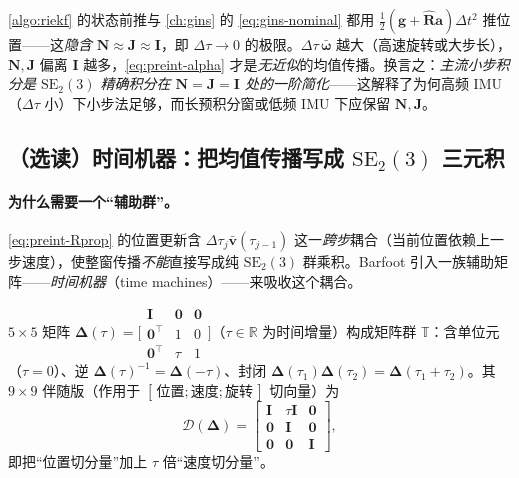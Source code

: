 \begin{insight}
\cref{algo:riekf} 的状态前推与 \cref{ch:gins} 的 \cref{eq:gins-nominal} 都用 $\tfrac12(\mathbf{g}+\hat{\mathbf{R}}\mathbf{a})\Delta t^2$ 推位置——这\emph{隐含} $\mathbf{N}\approx\mathbf{J}\approx\mathbf{I}$，即 $\Delta\tau\to0$ 的极限。$\Delta\tau\,\bar{\boldsymbol{\omega}}$ 越大（高速旋转或大步长），$\mathbf{N},\mathbf{J}$ 偏离 $\mathbf{I}$ 越多，\cref{eq:preint-alpha} 才是\emph{无近似}的均值传播。换言之：\emph{主流小步积分是 $\mathrm{SE}_2(3)$ 精确积分在 $\mathbf{N}=\mathbf{J}=\mathbf{I}$ 处的一阶简化}——这解释了为何高频 IMU（$\Delta\tau$ 小）下小步法足够，而长预积分窗或低频 IMU 下应保留 $\mathbf{N},\mathbf{J}$。
\end{insight}

\subsection{（选读）时间机器：把均值传播写成 \texorpdfstring{$\mathrm{SE}_2(3)$}{SE2(3)} 三元积}
\label{subsec:preint-timemachine}

\paragraph{为什么需要一个“辅助群”。}
\cref{eq:preint-Rprop} 的位置更新含 $\Delta\tau_j\bar{\mathbf{v}}(\tau_{j-1})$ 这一\emph{跨步}耦合（当前位置依赖上一步速度），使整窗传播\emph{不能}直接写成纯 $\mathrm{SE}_2(3)$ 群乘积。Barfoot 引入一族辅助矩阵——\emph{时间机器}（time machines）——来吸收这个耦合\cite{barfoot2024state}。

\begin{definition}\label{def:time-machine}
$5\times5$ 矩阵 $\boldsymbol{\Delta}(\tau)=\big[\begin{smallmatrix}\mathbf{I}&\mathbf{0}&\mathbf{0}\\\mathbf{0}^\top&1&0\\\mathbf{0}^\top&\tau&1\end{smallmatrix}\big]$（$\tau\in\mathbb{R}$ 为时间增量）构成矩阵群 $\mathbb{T}$：含单位元（$\tau=0$）、逆 $\boldsymbol{\Delta}(\tau)^{-1}=\boldsymbol{\Delta}(-\tau)$、封闭 $\boldsymbol{\Delta}(\tau_1)\boldsymbol{\Delta}(\tau_2)=\boldsymbol{\Delta}(\tau_1+\tau_2)$。其 $9\times9$ 伴随版（作用于 $[\,\text{位置};\text{速度};\text{旋转}\,]$ 切向量）为
\begin{equation}
  \boldsymbol{\mathcal{D}}(\boldsymbol{\Delta})=\begin{bmatrix}\mathbf{I}&\tau\mathbf{I}&\mathbf{0}\\\mathbf{0}&\mathbf{I}&\mathbf{0}\\\mathbf{0}&\mathbf{0}&\mathbf{I}\end{bmatrix},
  \label{eq:time-machine-D}
\end{equation}
即把“位置切分量”加上 $\tau$ 倍“速度切分量”。
\end{definition}

